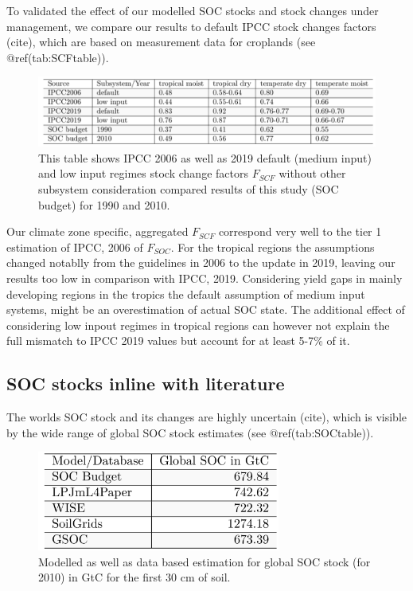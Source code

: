 \documentclass[gc, manuscript]{copernicus}
\begin{document}
To validated the effect of our modelled SOC stocks and stock changes
under management, we compare our results to default IPCC stock changes
factors (cite), which are based on measurement data for croplands (see
@ref(tab:SCFtable)).

\begin{figure}[H]
\includegraphics[width=16cm]{../ResultNotebooks/Output/Images/TableSCF_comparison} \caption{This table shows IPCC 2006 as well as 2019 default (medium input) and low input regimes stock change factors $F_{SCF}$ without other subsystem consideration compared results of this study (SOC budget) for 1990 and 2010.}\label{fig:SCFtable}
\end{figure}

Our climate zone specific, aggregated \(F_{SCF}\) correspond very well
to the tier 1 estimation of IPCC, 2006 of \(F_{SOC}\). For the tropical
regions the assumptions changed notablly from the guidelines in 2006 to
the update in 2019, leaving our results too low in comparison with IPCC,
2019. Considering yield gaps in mainly developing regions in the tropics
the default assumption of medium input systems, might be an
overestimation of actual SOC state. The additional effect of considering
low inpout regimes in tropical regions can however not explain the full
mismatch to IPCC 2019 values but account for at least 5-7\% of it.

\subsection{SOC stocks inline with literature}

The worlds SOC stock and its changes are highly uncertain (cite), which
is visible by the wide range of global SOC stock estimates (see
@ref(tab:SOCtable)).

\begin{figure}[H]
\includegraphics[width=8cm]{../ResultNotebooks/Output/Images/TableSOC_comparison} \caption{Modelled as well as data based estimation for global SOC stock (for 2010) in GtC for the first 30 cm of soil.}\label{fig:SOCtable}
\end{figure}
\end{document}
